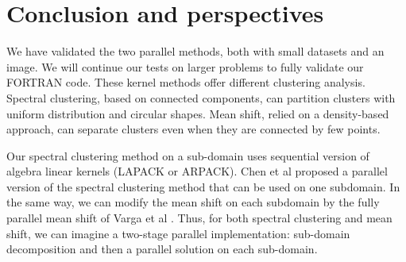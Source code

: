 \documentclass{llncs}
\begin{document}
\section{Conclusion and perspectives}

We have validated the two parallel methods, both with small datasets and an image.
We will continue our tests on larger problems to fully validate our FORTRAN
code. These kernel methods offer different clustering analysis. Spectral clustering, based on connected components,  can partition clusters with uniform distribution and circular shapes. Mean shift, relied on a density-based approach, can separate clusters even when they are connected by few points. 



Our spectral clustering method on a sub-domain uses sequential version of
algebra linear kernels (LAPACK or ARPACK). Chen et al \cite{Chen10} proposed a parallel version of the spectral clustering method that can be used on one subdomain. In the same way, we can modify the mean shift on each subdomain by the fully parallel mean shift of  Varga et al \cite{varga2011high}. Thus, for both
spectral clustering and mean shift, we can imagine a two-stage parallel
implementation: sub-domain decomposition and then a parallel solution on each
sub-domain. 
\end{document}
